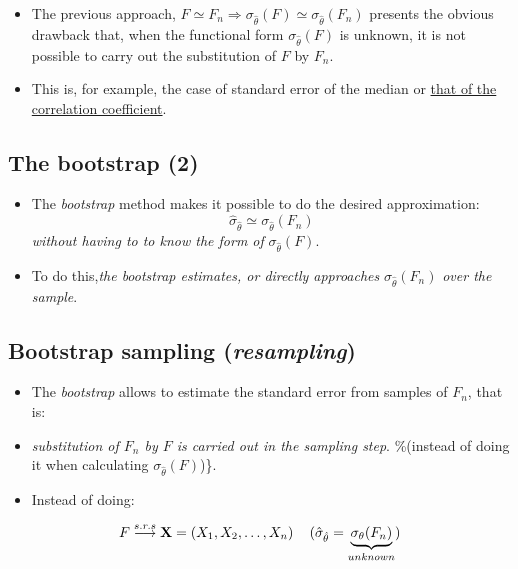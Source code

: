 \documentclass[
  letterpaper,
  DIV=11,
  numbers=noendperiod]{scrartcl}
\providecommand{\tightlist}{%
  \setlength{\itemsep}{0pt}\setlength{\parskip}{0pt}}\usepackage{longtable,booktabs,array}
\begin{document}
\begin{itemize}
\tightlist
\item
  The previous approach,
  \(F\simeq F_n \Longrightarrow \sigma_{\hat \theta}(F) \simeq \sigma_{\hat \theta}(F_n)\)
  presents the obvious drawback that, when the functional form
  \(\sigma _{\hat{\theta}}(F)\) is unknown, it is not possible to carry
  out the substitution of \(F\) by \(F_n\).
\item
  This is, for example, the case of standard error of the median or
  \href{http://artent.net/2012/07/31/standard-deviation-of-sample-median/}{that
  of the correlation coefficient}.
\end{itemize}

\hypertarget{the-bootstrap-2}{%
\subsection{The bootstrap (2)}\label{the-bootstrap-2}}

\begin{itemize}
\item
  The \emph{bootstrap} method makes it possible to do the desired
  approximation:
  \[\hat{\sigma}_{\hat\theta} \simeq \sigma _{\hat\theta}(F_n)\]
  \emph{without having to to know the form of}
  \(\sigma_{\hat\theta}(F)\).
\item
  To do this,\emph{the bootstrap estimates, or directly approaches}
  \(\sigma_{\hat{\theta}}(F_n)\) \emph{over the sample}.
\end{itemize}

\hypertarget{bootstrap-sampling-resampling}{%
\subsection{\texorpdfstring{Bootstrap sampling
(\emph{resampling})}{Bootstrap sampling (resampling)}}\label{bootstrap-sampling-resampling}}

\begin{itemize}
\item
  The \emph{bootstrap} allows to estimate the standard error from
  samples of \(F_n\), that is:
\item
  \emph{substitution of \(F_n\) by \(F\) is carried out in the sampling
  step}. \%(instead of doing it when calculating
  \(\sigma_{\hat{\theta}}(F)\))\}.
\item
  Instead of doing:
\end{itemize}

\[F\stackrel{s.r.s}{\longrightarrow }{\bf X} = 
(X_1,X_2,\dots, X_n) \, \quad (\hat \sigma_{\hat\theta} =\underbrace{\sigma_\theta(F_n)}_{unknown})
\]
\end{document}
